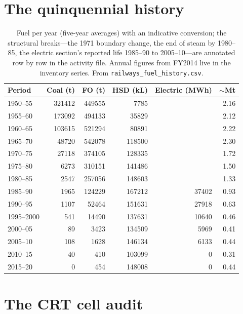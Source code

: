 \documentclass[5p,times,authoryear]{elsarticle}
\begin{document}
\section{The quinquennial history}

\begin{table}[htbp]
\centering
\footnotesize
\setlength{\tabcolsep}{4pt}
\begin{tabular}{@{}lrrrrr@{}}
\toprule
\textbf{Period} & \textbf{Coal (t)} & \textbf{FO (t)} & \textbf{HSD (kL)} &
\textbf{Electric (MWh)} & \textbf{$\sim$Mt \COe{}} \\
\midrule
1950--55 & 321412 & 449555 &   7785 &       & 2.16 \\
1955--60 & 173092 & 494133 &  35829 &       & 2.12 \\
1960--65 & 103615 & 521294 &  80891 &       & 2.22 \\
1965--70 &  48720 & 542078 & 118500 &       & 2.30 \\
1970--75 &  27118 & 374105 & 128335 &       & 1.72 \\
1975--80 &   6273 & 310151 & 141486 &       & 1.50 \\
1980--85 &   2547 & 257056 & 148603 &       & 1.33 \\
1985--90 &   1965 & 124229 & 167212 & 37402 & 0.93 \\
1990--95 &   1107 &  52464 & 151631 & 27918 & 0.63 \\
1995--2000 &  541 &  14490 & 137631 & 10640 & 0.46 \\
2000--05 &     89 &   3423 & 134509 &  5969 & 0.41 \\
2005--10 &    108 &   1628 & 146134 &  6133 & 0.44 \\
2010--15 &     40 &    410 & 103099 &     0 & 0.31 \\
2015--20 &      0 &    454 & 148008 &     0 & 0.44 \\
\bottomrule
\end{tabular}
\caption{Fuel per year (five-year averages) with an indicative \COe{} conversion; the
structural breaks---the 1971 boundary change, the end of steam by 1980--85, the electric
section's reported life 1985--90 to 2005--10---are annotated row by row in the activity
file. Annual figures from FY2014 live in the inventory series. From
\texttt{railways\_fuel\_history.csv}.}
\label{tab:history}
\end{table}

\section{The CRT cell audit}
\end{document}
